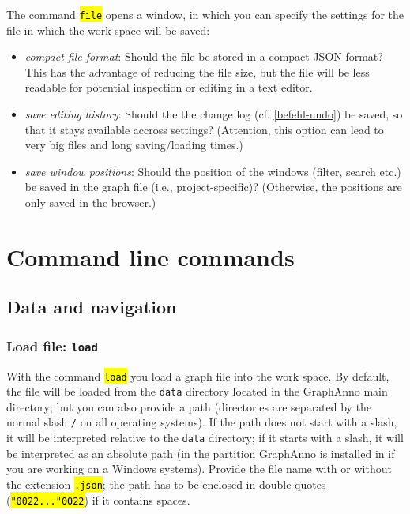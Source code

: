 \documentclass[12pt]{scrartcl}
\newcommand{\quo}{\char"0022}
\newcommand{\code}[1]{\hl{\texttt{#1}}}
\begin{document}
The command \code{file} opens a window, in which you can specify the settings for the file in which the work space will be saved:

\begin{itemize}
	\item	\textit{compact file format}: Should the file be stored in a compact JSON format?
			This has the advantage of reducing the file size, but the file will be less readable for potential inspection or editing in a text editor.
	\item	\textit{save editing history}: Should the the change log (cf. \ref{befehl-undo}) be saved, so that it stays available accross settings?
			(Attention, this option can lead to very big files and long saving/loading times.)
	\item	\textit{save window positions}: Should the position of the windows (filter, search etc.) be saved in the graph file (i.e., project-specific)?
			(Otherwise, the positions are only saved in the browser.)
\end{itemize}



\section{Command line commands}\label{commandline-commands}

\subsection{Data and navigation}

\subsubsection{Load file: \texttt{load}}

With the command \code{load} you load a graph file into the work space.
By default, the file will be loaded from the \texttt{data} directory located in the GraphAnno main directory; but you can also provide a path (directories are separated by the normal slash \texttt{/} on all operating systems).
If the path does not start with a slash, it will be interpreted relative to the \texttt{data} directory; if it starts with a slash, it will be interpreted as an absolute path (in the partition GraphAnno is installed in if you are working on a Windows systems).
Provide the file name with or without the extension \code{.json}; the path has to be enclosed in double quotes (\code{\quo...\quo}) if it contains spaces.
\end{document}
